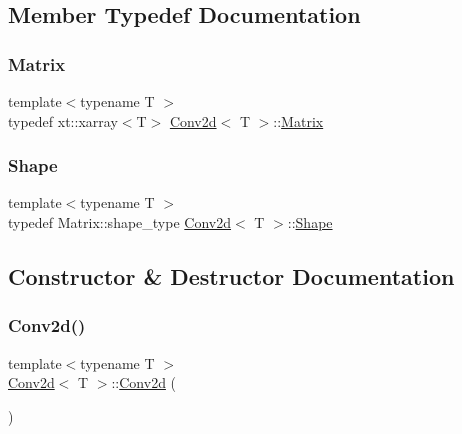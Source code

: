 \subsection{Member Typedef Documentation}
\mbox{\label{class_conv2d_a8263e2f2c46243e39fbca5712603c0fd}} 
\subsubsection{\texorpdfstring{Matrix}{Matrix}}
{\footnotesize\ttfamily template$<$typename T $>$ \\
typedef xt\+::xarray$<$T$>$ \mbox{\hyperlink{class_conv2d}{Conv2d}}$<$ T $>$\+::\mbox{\hyperlink{class_conv2d_a8263e2f2c46243e39fbca5712603c0fd}{Matrix}}}

\mbox{\label{class_conv2d_a78480f9c798b598a0bda9eadb1731225}} 
\subsubsection{\texorpdfstring{Shape}{Shape}}
{\footnotesize\ttfamily template$<$typename T $>$ \\
typedef Matrix\+::shape\+\_\+type \mbox{\hyperlink{class_conv2d}{Conv2d}}$<$ T $>$\+::\mbox{\hyperlink{class_conv2d_a78480f9c798b598a0bda9eadb1731225}{Shape}}}



\subsection{Constructor \& Destructor Documentation}
\mbox{\label{class_conv2d_ae28c4831d44bdf769768f29b9892e5d2}} 
\subsubsection{\texorpdfstring{Conv2d()}{Conv2d()}\hspace{0.1cm}{\footnotesize\ttfamily [1/2]}}
{\footnotesize\ttfamily template$<$typename T $>$ \\
\mbox{\hyperlink{class_conv2d}{Conv2d}}$<$ T $>$\+::\mbox{\hyperlink{class_conv2d}{Conv2d}} (\begin{DoxyParamCaption}{ }\end{DoxyParamCaption})\hspace{0.3cm}{\ttfamily [default]}}

